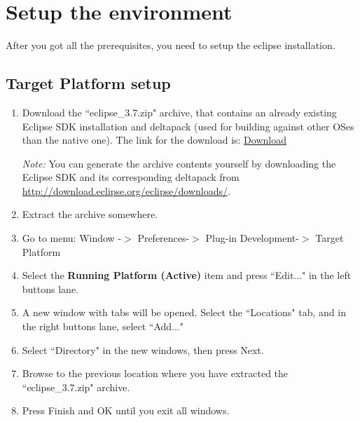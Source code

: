 \documentclass[10pt]{article}
\begin{document}
\section{Setup the environment}
After you got all the prerequisites, you need to setup the eclipse installation.

\subsection{Target Platform setup}
\begin{enumerate}
\item Download the ``eclipse\_3.7.zip" archive, that contains an already existing Eclipse SDK installation and deltapack (used for building against other OSes than the native one). The link for the download is: \href{http://sourceforge.net/projects/wesnoth/files/wesnoth-umcplugin/build\_utils/eclipse\_3.7.zip/download}{Download}

\textit{Note:} You can generate the archive contents yourself by downloading the Eclipse SDK and its corresponding deltapack from \url{http://download.eclipse.org/eclipse/downloads/}.

\item Extract the archive somewhere.

\item Go to menu: Window -$>$ Preferences-$>$ Plug-in Development-$>$ Target Platform

\item Select the \textbf{Running Platform (Active)} item and press ``Edit..." in the left buttons lane.

\item A new window with tabs will be opened. Select the ``Locations" tab, and in the right buttons lane, select ``Add..."

\item Select ``Directory" in the new windows, then press Next.

\item Browse to the previous location where you have extracted the ``eclipse\_3.7.zip" archive.

\item Press Finish and OK until you exit all windows.
\end{enumerate}
\end{document}
